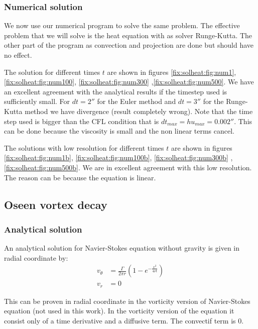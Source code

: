 \subsubsection{Numerical solution}

We now use our numerical program to solve the same problem. The effective problem that we will solve is the heat equation with as solver Runge-Kutta.
The other part of the program as convection and projection are done but should have no effect.

The solution for different times $t$ are shown in figures \ref{fix:solheat:fig:num1}, \ref{fix:solheat:fig:num100}, \ref{fix:solheat:fig:num300} ,\ref{fix:solheat:fig:num500}. We have an excellent agreement with the analytical results if the timestep used is sufficiently small.
For $dt=2\second$ for the Euler method and $dt=\unit{3}{\second}$ for the Runge-Kutta method we have divergence (result completely wrong).
Note that the time step used is bigger than the CFL condition that is $dt_{max}=hu_{max}=\unit{0.002}{\second}$. This can be done because the viscosity is small and the non linear terms cancel.

The solutions with low resolution for different times $t$ are shown in figures \ref{fix:solheat:fig:num1b}, \ref{fix:solheat:fig:num100b}, \ref{fix:solheat:fig:num300b} ,\ref{fix:solheat:fig:num500b}.
We are in excellent agreement with this low resolution. The reason can be because the equation is linear. 


\FloatBarrier
\subsection{Oseen vortex decay}

\subsubsection{Analytical solution}

An analytical solution for Navier-Stokes equation without gravity is given in radial coordinate by:
\begin{align}\label{fixed:vortex}
 v_{\theta}&=\frac{\Gamma}{2\pi r}\left(1-e^{-\frac{x^2}{4\nu t}}\right)\\
 v_{r}&=0
\end{align}

This can be proven in radial coordinate in the vorticity version of Navier-Stokes equation (not used in this work).
In the vorticity version of the equation it consist only of a time derivative and a diffusive term.
The convectif term is 0.

